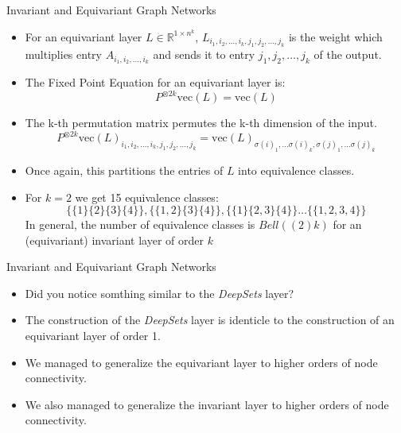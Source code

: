 \documentclass{beamer}
\begin{document}
\begin{frame}{Invariant and Equivariant Graph Networks}
    \begin{itemize}
        \setlength{\itemsep}{\fill}
        \item For an equivariant layer $L \in \mathbb{R}^{1 \times n^k}$, $L_{i_1,i_2,\ldots,i_k, j_1, j_2,\ldots,j_k}$ is the weight which multiplies entry $A_{i_1,i_2,\ldots,i_k}$ 
        and sends it to entry ${j_1,j_2,\ldots,j_k}$ of the output.
        \item The Fixed Point Equation for an equivariant layer is:
        \[ P^{\otimes 2k}\text{vec}(L) = \text{vec}(L) \]
        \item The k-th permutation matrix permutes the k-th dimension of the input. 
        \[ P^{\otimes 2k}\text{vec}(L)_{i_1,i_2,\ldots,i_k, j_1, j_2,\ldots,j_k} = \text{vec}(L)_{\sigma(i)_1, \ldots \sigma(i)_k, \sigma(j)_1, \ldots \sigma(j)_k} \]
        \item Once again, this partitions the entries of $L$ into equivalence classes.
        \item For $k=2$ we get 15 equivalence classes:
        \[ \{\{1\} \{2\} \{3\} \{4\}\}, \{\{1, 2\} \{3\} \{4\}\}, \{\{1\} \{2, 3\} \{4\}\} \ldots \{\{1, 2, 3, 4\}\}\]
        In general, the number of equivalence classes is $Bell((2)k)$ for an (equivariant) invariant layer of order $k$
    \end{itemize}
\end{frame}
\begin{frame}{Invariant and Equivariant Graph Networks}
    \begin{itemize}
        \setlength{\itemsep}{\fill}
        \item Did you notice somthing similar to the \emph{DeepSets} layer?
        \item The construction of the \emph{DeepSets} layer is identicle to the construction of an equivariant layer of order 1.
        \item We managed to generalize the equivariant layer to higher orders of node connectivity.
        \item We also managed to generalize the invariant layer to higher orders of node connectivity.
    \end{itemize}
\end{frame}
\end{document}
